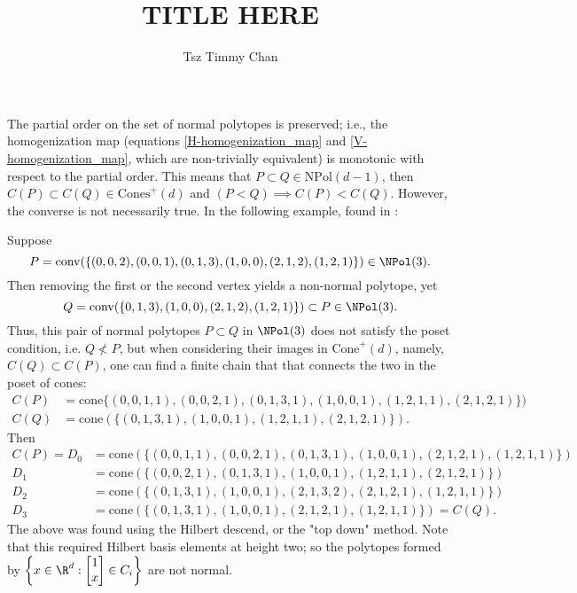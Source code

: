 \documentclass{TC}
\title{TITLE HERE}	%
\author{Tsz Timmy Chan}	%
\begin{document}
The partial order on the set of normal polytopes is preserved; i.e., the homogenization map (equations \ref{H-homogenization_map} and \ref{V-homogenization_map}, which are non-trivially equivalent) is monotonic with respect to the partial order. This means that  $P \subset Q \in \mathrm{NPol}(d-1)$, then $C(P) \subset C(Q) \in \mathrm{Cones}^+(d)$ and $(P < Q) \implies C(P) < C(Q)$. However, the converse is not necessarily true. 
In the following example, found in \cite{BrunsGubeladzeNormalPolytopes}:
\begin{example}
Suppose $$ P = \mathrm{conv}(\{(0,0,2),(0,0,1),(0,1,3),(1,0,0),(2,1,2),(1,2,1)\}) \in \NPol(3).$$
Then removing the first or the second vertex yields a non-normal polytope, yet $$Q = \mathrm{conv}(\{0,1,3),(1,0,0),(2,1,2),(1,2,1)\}) \subset P \in \NPol(3). $$
Thus, this pair of normal polytopes $P \subset Q$ in $\NPol(3)$ does not satisfy the poset condition, i.e. $Q \not < P$, but when considering their images in $\mathrm{Cone}^+(d)$, namely, $C(Q) \subset C(P)$, one can find a finite chain that that connects the two in the poset of cones:
\begin{align*}
C(P) &= \mathrm{cone}\{(0, 0, 1, 1), (0, 0, 2, 1), (0, 1, 3, 1), (1, 0, 0, 1), (1, 2, 1, 1), (2, 1, 2, 1)\})\\
C(Q) &= \mathrm{cone}(\{(0, 1, 3, 1), (1, 0, 0, 1), (1, 2, 1, 1), (2, 1, 2, 1)\}).
\end{align*}
Then
\begin{align*}
 C(P) = D_0 &=  \mathrm{cone}(\{(0, 0, 1, 1),(0, 0, 2, 1),(0, 1, 3, 1),(1, 0, 0, 1),(2, 1, 2, 1),(1, 2, 1, 1)\}) \\
 D_1 &= \mathrm{cone}(\{(0, 0, 2, 1), (0, 1, 3, 1), (1, 0, 0, 1), (1, 2, 1, 1), (2, 1, 2, 1)\})\\
 D_2 &= \mathrm{cone}(\{(0, 1, 3, 1),(1, 0, 0, 1),(2, 1, 3, 2),(2, 1, 2, 1),(1, 2, 1, 1)\})\\
 D_3 &= \mathrm{cone}(\{(0, 1, 3, 1),(1, 0, 0, 1),(2, 1, 2, 1),(1, 2, 1, 1)\}) = C(Q).
 \end{align*}
 The above was found using the Hilbert descend, or the "top down" method. Note that this required Hilbert basis elements at height two; so the polytopes formed by $\left\{ x \in \R^d: \begin{bmatrix} 1 \\ x\end{bmatrix} \in C_i \right\}$ are not normal.
\end{example}
\end{document}
